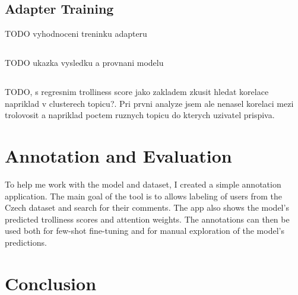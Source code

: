 \documentclass[twoside]{ctuthesis}
\theoremstyle{plain}
\theoremstyle{definition}
\theoremstyle{note}
\begin{document}
\section{Adapter Training}
TODO vyhodnoceni treninku adapteru

\section{}
TODO ukazka vysledku a provnani modelu

\section{}
TODO, s regresnim trolliness score jako zakladem zkusit hledat korelace napriklad v clusterech topicu?. Pri prvni analyze jsem ale nenasel korelaci mezi trolovosit a napriklad poctem ruznych topicu do kterych uzivatel prispiva. 

\chapter{Annotation and Evaluation}

To help me work with the model and dataset, I created a simple annotation application. The main goal of the tool is to allows labeling of users from the Czech dataset and search for their comments. The app also shows the model's predicted trolliness scores and attention weights. The annotations can then be used both for few-shot fine-tuning and for manual exploration of the model's predictions.\par


\chapter{Conclusion}

\appendix

\printindex

 

\end{document}
